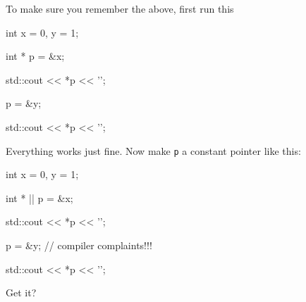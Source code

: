 To make sure you remember the above, first run this



\begin{consolethree}[escapeinside=||]

int x = 0, y = 1;

int * p = &x;

std::cout << *p << '\n';

p = &y;

std::cout << *p << '\n'; 

\end{consolethree}

Everything works just fine. Now make \texttt{p} a constant pointer like this:



\begin{consolethree}[escapeinside=||]

int x = 0, y = 1;

int * || p = &x;

std::cout << *p << '\n';

p = &y; // compiler complaints!!!

std::cout << *p << '\n'; 

\end{consolethree}

Get it?

